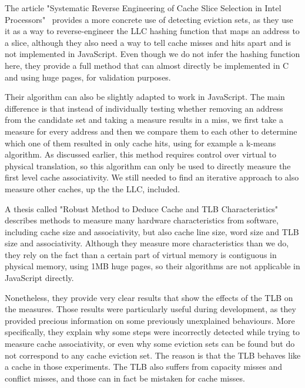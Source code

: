 \documentclass[a4paper,11pt,oneside]{report}
\begin{document}

The article "Systematic Reverse Engineering of Cache Slice Selection in Intel Processors"~\cite{slice_reverse_engineer} provides a more concrete use of detecting eviction sets, as they use it as a way to reverse-engineer the LLC hashing function that maps an address to a slice, although they also need a way to tell cache misses and hits apart and is not implemented in JavaScript. Even though we do not infer the hashing function here, they provide a full method that can almost directly be implemented in C and using huge pages, for validation purposes.

Their algorithm can also be slightly adapted to work in JavaScript. The main difference is that instead of individually testing whether removing an address from the candidate set and taking a measure results in a miss, we first take a measure for every address and then we compare them to each other to determine which one of them resulted in only cache hits, using for example a k-means algorithm. As discussed earlier, this method requires control over virtual to physical translation, so this algorithm can only be used to directly measure the first level cache associativity. We still needed to find an iterative approach to also measure other caches, up the the LLC, included.


A thesis called "Robust Method to Deduce Cache and TLB Characteristics"~\cite{tlb_characteristics} describes methods to measure many hardware characteristics from software, including cache size and associativity, but also cache line size, word size and TLB size and associativity. Although they measure more characteristics than we do, they rely on the fact than a certain part of virtual memory is contiguous in physical memory, using 1MB huge pages, so their algorithms are not applicable in JavaScript directly.

Nonetheless, they provide very clear results that show the effects of the TLB on the measures. Those results were particularly useful during development, as they provided precious information on some previously unexplained behaviours. More specifically, they explain why some steps were incorrectly detected while trying to measure cache associativity, or even why some eviction sets can be found but do not correspond to any cache eviction set. The reason is that the TLB behaves like a cache in those experiments. The TLB also suffers from capacity misses and conflict misses, and those can in fact be mistaken for cache misses.
\end{document}
